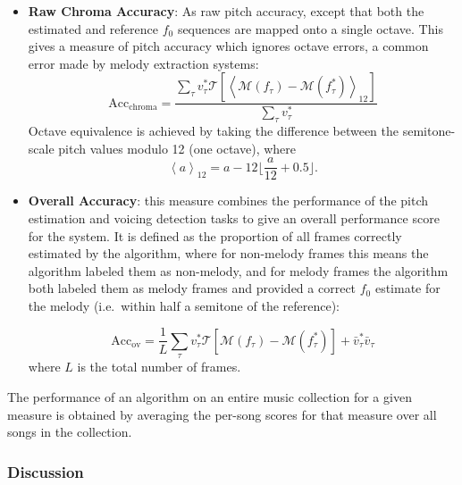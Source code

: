 \documentclass{article}
\begin{document}
\begin{itemize}
  \item \textbf{Raw Chroma Accuracy}: As raw pitch accuracy, except
  that both the estimated and reference $f_0$ sequences are mapped onto a
  single octave. This gives a measure of pitch accuracy which ignores octave
  errors, a common error made by melody extraction systems:
\begin{equation}
\text{Acc}_\text{chroma}= \frac{\sum_\tau v^*_\tau \mathcal{T}\left[\left<\mathcal{M}(f_\tau)-\mathcal{M}(f^*_\tau)\right>_{12} \right] }{\sum_\tau v^*_\tau}
\end{equation}
Octave equivalence is achieved by taking the difference between the semitone-scale pitch 
values modulo 12 (one octave), where
\begin{equation}
\left<a\right>_{12} = a - 12 \lfloor \frac{a}{12} + 0.5 \rfloor .
\end{equation}

  \item \textbf{Overall Accuracy}: this measure combines the performance of the
  pitch estimation and voicing detection tasks to give an overall performance
  score for the system. It is defined as the proportion of all frames
   correctly estimated by the algorithm, where for non-melody
  frames this means the algorithm labeled them as non-melody, and for melody
  frames the algorithm both labeled them as melody frames and provided a correct
  $f_0$ estimate for the melody (i.e.~within half a semitone of the
  reference):

\begin{equation}
\text{Acc}_\text{ov} 
= \frac{1}{L} \sum_\tau v^*_\tau \mathcal{T}\left[\mathcal{M}(f_\tau)-\mathcal{M}(f^*_\tau) \right] + \bar{v}^*_\tau \bar{v}_\tau 
\end{equation}
where $L$ is the total number of frames.
\end{itemize}

The performance of an algorithm on an entire music collection for a given
measure is obtained by averaging the per-song scores for that measure over
all songs in the collection. 

\subsubsection{Discussion}
\end{document}
